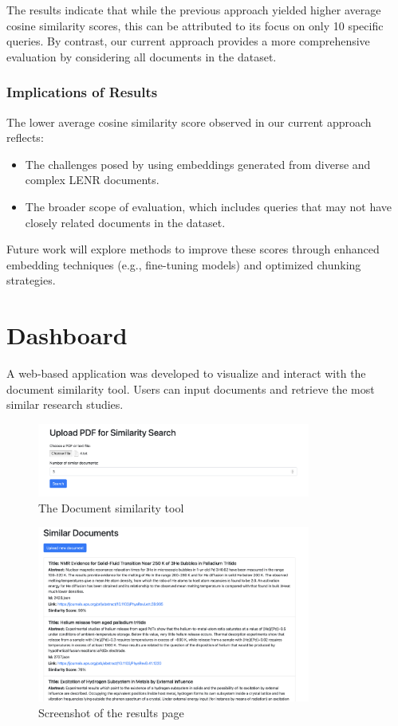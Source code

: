 \documentclass[12pt]{article}
\begin{document}
The results indicate that while the previous approach yielded higher average cosine similarity scores, this can be attributed to its focus on only 10 specific queries. By contrast, our current approach provides a more comprehensive evaluation by considering all documents in the dataset.

\subsubsection{Implications of Results}

The lower average cosine similarity score observed in our current approach reflects:
\begin{itemize}
    \item The challenges posed by using embeddings generated from diverse and complex LENR documents.
    \item The broader scope of evaluation, which includes queries that may not have closely related documents in the dataset.
\end{itemize}

Future work will explore methods to improve these scores through enhanced embedding techniques (e.g., fine-tuning models) and optimized chunking strategies.

    \section{Dashboard}
    A web-based application was developed to visualize and interact with the document similarity tool. 
    Users can input documents and retrieve the most similar research studies.
    \begin{figure}[h!]
        \centering
        \includegraphics[width=0.8\textwidth]{images/query.png}
        \caption{The Document similarity tool}
        \label{fig:Screenshot of the document similarity tool}
    \end{figure}

    \begin{figure}[h!]
        \centering
        \includegraphics[width=0.8\textwidth]{images/result.png}
        \caption{Screenshot of the results page}
        \label{fig:Screenshot of the results page}
    \end{figure}
\end{document}

